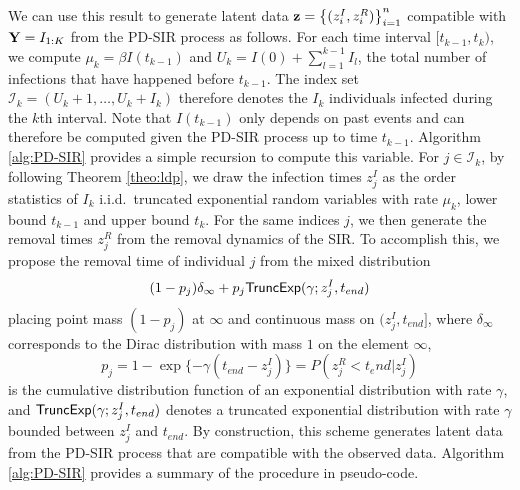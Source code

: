 \documentclass[11pt]{article}
\begin{document}
	We can use this result to generate latent data  $\mathbf{z} = \left\lbrace (z^I_i, z^R_i)\right\rbrace_{i=1}^{n}$ compatible with $\mathbf{Y} = I_{1:K}$ from the PD-SIR process as follows. For each time interval $[t_{k-1}, t_k)$, we compute $\mu_k = \beta I(t_{k-1})$ and $U_k = I(0) + \sum_{l=1}^{k-1} I_l$, the total number of infections that have happened before $t_{k-1}$. The index set $\mathcal{I}_k = (U_k + 1, \dots, U_k + I_k)$ therefore denotes the $I_k$ individuals infected during the $k$th interval. Note that $I(t_{k-1})$ only depends on past events and can therefore be computed given the PD-SIR process up to time $t_{k-1}$. Algorithm \ref{alg:PD-SIR} provides a simple recursion to compute this variable. For $j \in \mathcal{I}_k$, by following Theorem \ref{theo:ldp}, we draw the infection times $z^I_j$ as the order statistics of $I_k$ i.i.d.\ truncated exponential random variables with rate $\mu_k$, lower bound $t_{k-1}$ and upper bound $t_k$. For the same indices $j$, we then generate the removal times $z^R_j$ from the removal dynamics of the SIR. To accomplish this, we propose the removal time of individual $j$ from the mixed distribution
	$$(1 - p_j) \delta_{\infty} + p_j \textsf{TruncExp}(\gamma; z^I_j, t_{end})$$
	placing point mass $(1 - p_j)$ at $\infty$ and continuous mass on $(z^I_j, t_{end}]$,
	where $\delta_{\infty}$ corresponds to the Dirac distribution with mass $1$ on the element $\infty$,
	$$p_j = 1 - \exp\{-\gamma (t_{end} - z^I_j)\} = P(z^R_j < t_end | z^I_j)$$
	is the cumulative distribution function of an exponential distribution with rate $\gamma$, %
	and $\textsf{TruncExp}(\gamma; z^I_j, t_{end})$ denotes a truncated exponential distribution with rate $\gamma$ bounded between $z^I_j$ and  $t_{end}$. By construction, this scheme generates latent data from the PD-SIR process that are compatible with the observed data. Algorithm \ref{alg:PD-SIR} provides a summary of the procedure in pseudo-code.
	
\end{document}
